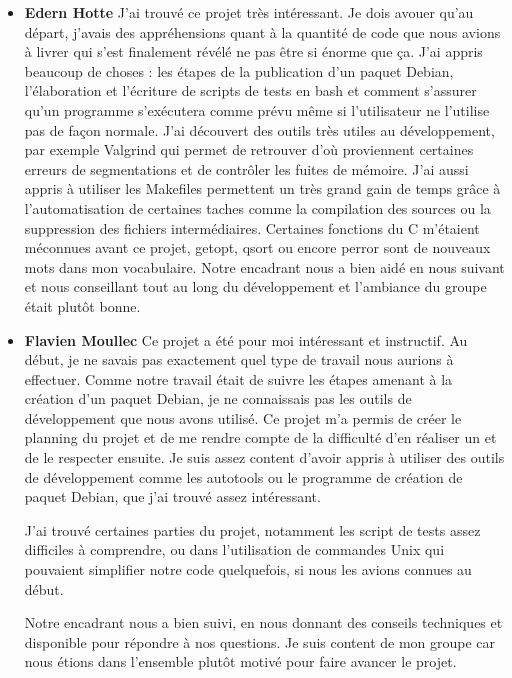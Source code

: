 \begin{itemize}
En conclusion, m\^eme si je reste un d\'ebutant en informatique, j'ai pu d\'ecouvrir comment r\'ealiser un projet informatique en \'etant un acteur m\^eme du projet. Et pour cela ce travail fut une exp\'erience unique car non r\'ealisable si ce n'est dans un contexte comme celui-ci. Apr\`es il est vrai que des notions informatiques utilis\'ees lors du projet sont encore obscures pour moi mais l'essentiel je pense n'est pas l\`a.
\newline
\item [\textbullet] \Large \textbf{Edern Hotte}
\newline
\normalsize
J'ai trouv\'e ce projet tr\`es int\'eressant. Je dois avouer qu'au d\'epart, j'avais des appr\'ehensions quant \`a la quantit\'e de code que nous avions \`a livrer qui s'est finalement 
r\'ev\'el\'e ne pas \^etre si \'enorme que \c ca. J'ai appris beaucoup de choses : les \'etapes de la publication d'un paquet Debian, l'\'elaboration et l'\'ecriture de scripts de tests 
en bash et comment s'assurer qu'un programme s'ex\'ecutera comme pr\'evu m\^eme si l'utilisateur ne l'utilise pas de fa\c con normale. J'ai d\'ecouvert des outils tr\`es utiles au d\'eveloppement, par exemple Valgrind qui permet de retrouver
d'o\`u proviennent certaines erreurs de segmentations et de contr\^oler les fuites de m\'emoire. J'ai aussi appris \`a utiliser les Makefiles permettent un tr\`es grand gain
de temps gr\^ace \`a l'automatisation de certaines taches comme la compilation des sources ou la suppression des fichiers interm\'ediaires. Certaines fonctions du C m'\'etaient m\'econnues avant ce projet,
getopt, qsort ou encore perror sont de nouveaux mots dans mon vocabulaire. Notre encadrant nous a bien aid\'e en nous suivant et nous conseillant tout au long du d\'eveloppement et l'ambiance du groupe \'etait plut\^ot bonne.
\newline
\item [\textbullet] \Large \textbf{Flavien Moullec}
\newline
\normalsize
Ce projet a \'et\'e pour moi int\'eressant et instructif. Au d\'ebut, je ne savais pas exactement quel type de travail nous aurions \`a effectuer.
Comme notre travail \'etait de suivre les \'etapes amenant \`a la cr\'eation d'un paquet Debian, je ne connaissais pas les outils de
d\'eveloppement que nous avons utilis\'e. Ce projet m'a permis de cr\'eer le planning du projet et de me rendre compte de la difficult\'e d'en r\'ealiser un
et de le respecter ensuite. Je suis assez content d'avoir appris \`a utiliser des outils de d\'eveloppement comme les autotools ou le programme de cr\'eation de 
paquet Debian, que j'ai trouv\'e assez int\'eressant.

J'ai trouv\'e certaines parties du projet, notamment les script de tests assez difficiles \`a comprendre, ou dans l'utilisation de commandes Unix qui pouvaient
simplifier notre code quelquefois, si nous les avions connues au d\'ebut.

Notre encadrant nous a bien suivi, en nous donnant des conseils techniques et disponible pour r\'epondre \`a nos questions.
Je suis content de mon groupe car nous \'etions dans l'ensemble plut\^ot motiv\'e pour faire avancer le projet.


\end{itemize}
